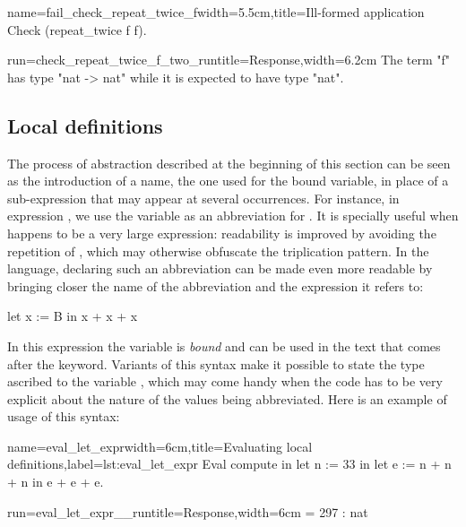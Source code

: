 \begin{coq}{name=fail_check_repeat_twice_f}{width=5.5cm,title=Ill-formed
  application}
Check (repeat_twice f f).
\end{coq}
\begin{coqout}{run=check_repeat_twice_f_two_run}{title=Response,width=6.2cm}
The term "f" has type "nat -> nat"
while it is expected to have type "nat".
\end{coqout}

\subsection{Local definitions}

The process of abstraction described at the beginning of this section
can be seen as the introduction of a name, the one used for the bound
variable, in place of a sub-expression that may appear at
several occurrences. For instance, in expression
, we use the variable  as an
abbreviation for . It is specially useful when  happens to
be a very large expression: readability is improved by avoiding the
repetition of , which may otherwise obfuscate the triplication
pattern. In the \Coq{}
language, declaring such an abbreviation can be made even more
readable by bringing closer the name of the abbreviation  and the
expression it refers to:

\begin{coq}{}{}
let x := B in
   x + x + x
\end{coq}

In this expression the variable  is {\em bound} and can be used in
the text that comes after the  keyword.
Variants of this syntax make it possible to state the
type ascribed to the variable , which may come handy when the
code has to be very explicit about the nature of the values being
abbreviated.
Here is an example of usage of this syntax:

\begin{coq}{name=eval_let_expr}{width=6cm,title=Evaluating local definitions,label=lst:eval_let_expr}
Eval compute in
  let n := 33 in
  let e := n + n + n in
    e + e + e.
\end{coq}
\begin{coqout}{run=eval_let_expr__run}{title=Response,width=6cm}
 = 297 : nat
\end{coqout}

